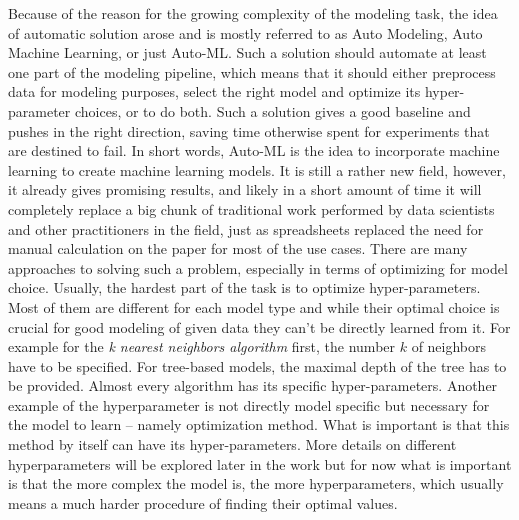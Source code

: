 \documentclass[a4paper,twoside,12pt]{book}
\begin{document}
Because of the reason for the growing complexity of the modeling task, the idea of automatic solution arose and is mostly referred to as Auto Modeling, Auto Machine Learning, or just Auto-ML. Such a solution should automate at least one part of the modeling pipeline, which means that it should either preprocess data for modeling purposes, select the right model and optimize its hyper-parameter choices, or to do both.
Such a solution gives a good baseline and pushes in the right direction, saving time otherwise spent for experiments that are destined to fail. In short words, Auto-ML is the idea to incorporate machine learning to create machine learning models. It is still a rather new field, however, it already gives promising results, and likely in a short amount of time it will completely replace a big chunk of traditional work performed by data scientists and other practitioners in the field, just as spreadsheets replaced the need for manual calculation on the paper for most of the use cases.
\newline
There are many approaches to solving such a problem, especially in terms of optimizing for model choice. 
Usually, the hardest part of the task is to optimize hyper-parameters. Most of them are different for each model type and while their optimal choice is crucial for good modeling of given data they can't be directly learned from it. For example for the \emph{k nearest neighbors algorithm} first, the number $k$ of neighbors have to be specified. For tree-based models, the maximal depth of the tree has to be provided. Almost every algorithm has its specific hyper-parameters. 
Another example of the hyperparameter is not directly model specific but necessary for the model to learn -- namely optimization method. What is important is that this method by itself can have its hyper-parameters. More details on different hyperparameters will be explored later in the work but for now what is important is that the more complex the model is, the more hyperparameters, which usually means a much harder procedure of finding their optimal values.
\newline
\end{document}
